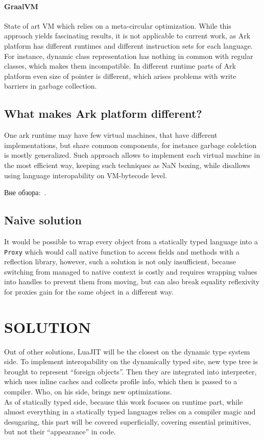 \documentclass[times, %
	specification,annotation, %
	titlepage-extra-ru,specification-extra-ru,annotation-extra-ru, %
	languages={russian,english} %
	]{itmo-student-thesis}
\begin{document}
\subsubsection{GraalVM}
State of art VM which relies on a meta-circular optimization. While this approach yields fascinating results, it is not applicable to current work, as Ark platform has different runtimes and different instruction sets for each language. For instance, dynamic class representation has nothing in common with regular classes, which makes them incompatible. In different runtime parts of Ark platform even size of pointer is different, which arises problems with write barriers in garbage collection.

\finishrelatedwork

\section{What makes Ark platform different?}
One ark runtime may have few virtual machines, that have different implementations, but share common components, for instance garbage colelction is mostly generalized. Such approach allows to implement each virtual machine in the most efficient way, keeping such techniques as NaN boxing, while disallows using language interopability on VM-bytecode level.

Вне обзора:~\cite{bellman}.

\section{Naive solution}
It would be possible to wrap every object from a statically typed language into a \texttt{Proxy} which would call native function to access fields and methods with a reflection library, however, such a solution is not only insufficient, because switching from managed to native context is costly and requires wrapping values into handles to prevent them from moving, but can also break equality reflexivity for proxies gain for the same object in a different way.

\chapter{SOLUTION}

Out of other solutions, LuaJIT will be the closest on the dynamic type system side. To implement interopability on the dynamically typed site, new type tree is brought to represent ``foreign objects''. Then they are integrated into interpreter, which uses inline caches and collects profile info, which then is passed to a compiler. Who, on his side, brings new optimizations.\\
As of statically typed side, because this work focuses on runtime part, while almost everything in a statically typed languages relies on a compiler magic and desugaring, this part will be covered superficially, covering essential primitives, but not their ``appearance'' in code.
\end{document}
